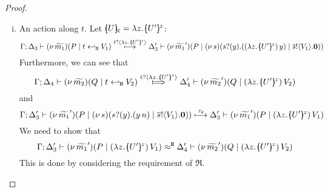 \begin{proof}
\begin{enumerate}[$-$]
\begin{enumerate}
\begin{enumerate}[i)]
						\item	An action along $t$. Let $\omapchar{U} = \abs{z}{\mapchar{U'}{z}}$: 
							\[
								\horel{\Gamma}{\Delta_3}{\newsp{\widetilde{m_1}}{P \Par \htrigger{t}{V_1}  } }
								{\hby{\bactinp{t}{\abs{z}{\mapchar{U'}{z}}}}}
								{\Delta_3'}{\newsp{\widetilde{m_1}'}{P \Par \newsp{s}{\binp{s}{y} {(\appl{(\abs{z}{\mapchar{U'}{z}})}{y}}) \Par \bout{\dual{s}}{V_1} \inact}}}
							\]
							Furthermore, we can see that
							\[
								\horel{\Gamma}{\Delta_4}{\newsp{\widetilde{m_2}}{Q \Par \htrigger{t}{V_2}  } }
								{\Hby{\bactinp{t}{\abs{z}{\mapchar{U'}{z}}}}}
								{\Delta_4'}{\newsp{\widetilde{m_2}'}{Q \Par \appl{(\abs{z}{\mapchar{U'}{z}})}{V_2}}}
							\]
							 and
							\[
								\Gamma; \Delta_3' \vdash (\nu\, \widetilde{m_1}')(P \;|\; (\nu\, s)(s ? (y) .{(y\, {n})} \;|\; \overline{s} ! \langle V_1 \rangle . \mathbf{0})) \stackrel{\tau_{\mathsf{d}}}{\longmapsto} \Delta_3' \vdash (\nu\, \widetilde{m_1}')(P \;|\; (\lambda z.\,[\!\!(U')\!\!]^{z})\, {V_1})
							\]
							We need to show that
							\[
								\horel{\Gamma}{\Delta_3'}{\newsp{\widetilde{m_1}'}{P \Par \appl{(\abs{z}{\mapchar{U'}{z}})}{V_1}}}
								{\hwb}
								{\Delta_4'}{\newsp{\widetilde{m_2}'}{Q \Par \appl{(\abs{z}{\mapchar{U'}{z}})}{V_2}}}
							\]
							This is done by considering the requirement of $\Re$.


\end{enumerate}
\end{enumerate}
\end{enumerate}
\end{proof}
